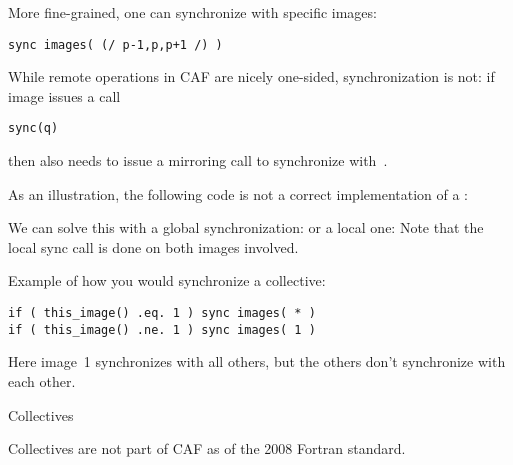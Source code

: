 More fine-grained, one can synchronize with specific images:
\begin{lstlisting}
sync images( (/ p-1,p,p+1 /) )
\end{lstlisting}
While remote operations in \ac{CAF} are nicely one-sided,
synchronization is not:
if image  issues a call
\begin{lstlisting}
sync(q)
\end{lstlisting}
then  also needs to issue a mirroring call to synchronize with~.

As an illustration, the following code is not a correct implementation of a 
:
%

We can solve this with a global synchronization:
%
%
or a local one:
%
%
Note that the local sync call is done on both images involved.

Example of how you would synchronize a collective:
\begin{lstlisting}
if ( this_image() .eq. 1 ) sync images( * )
if ( this_image() .ne. 1 ) sync images( 1 )
\end{lstlisting}
Here image~1 synchronizes with all others, but the others don't
synchronize with each other.


 {Collectives}

Collectives are not part of \ac{CAF} as of the 2008 Fortran standard.

